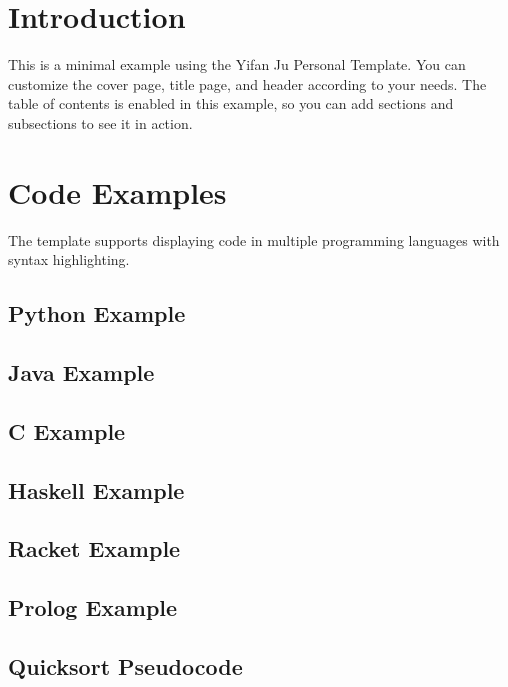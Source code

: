 \documentclass{article}
\begin{document}
\makefrontmatter
\setupHeaderStyle

\section{Introduction}
This is a minimal example using the Yifan Ju Personal Template. You can customize the cover page, title page, and header according to your needs. The table of contents is enabled in this example, so you can add sections and subsections to see it in action.

\section{Code Examples}
The template supports displaying code in multiple programming languages with syntax highlighting.

\subsection{Python Example}

\subsection{Java Example}

\subsection{C Example}

\subsection{Haskell Example}

\subsection{Racket Example}

\subsection{Prolog Example}

\subsection{Quicksort Pseudocode}
\end{document}

